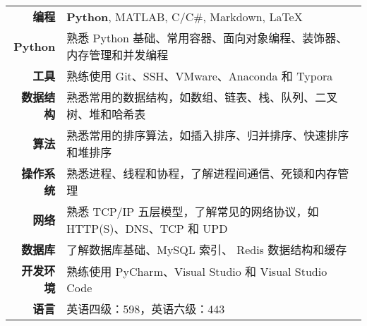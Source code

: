 %

\begin{table}[!htbp]
    \begin{tabular}{rl}
        \icon{\faCode} \textbf{编程} & \textbf{Python}, MATLAB, C/C\#, Markdown, \LaTeX \\
        \textbf{Python} & 熟悉 Python 基础、常用容器、面向对象编程、装饰器、内存管理和并发编程 \\
        \icon{\faTools} \textbf{工具} & 熟练使用 Git、SSH、VMware、Anaconda 和 Typora \\
        \textbf{数据结构} & 熟悉常用的数据结构，如数组、链表、栈、队列、二叉树、堆和哈希表 \\
        \icon{\faSortAmountUpAlt} \textbf{算法} & 熟悉常用的排序算法，如插入排序、归并排序、快速排序和堆排序 \\
        \textbf{操作系统} & 熟悉进程、线程和协程，了解进程间通信、死锁和内存管理 \\
        \icon{\faNetworkWired} \textbf{网络} & 熟悉 TCP/IP 五层模型，了解常见的网络协议，如 HTTP(S)、DNS、TCP 和 UPD \\
        \textbf{数据库} & 了解数据库基础、MySQL 索引、 Redis 数据结构和缓存 \\
        \textbf{开发环境} & 熟练使用 PyCharm、Visual Studio 和 Visual Studio Code \\
        
        \icon{\faLanguage} \textbf{语言} & 英语四级：598，英语六级：443 
    \end{tabular}
\end{table} 
